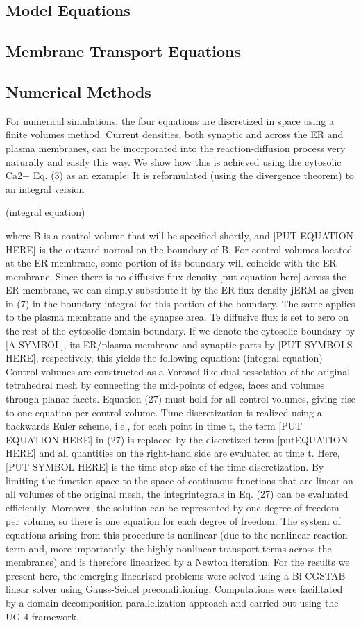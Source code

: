 \documentclass[fleqn,10pt]{wlscirep}
\begin{document}
\subsection*{Model Equations}
\subsection*{Membrane Transport Equations}

\subsection*{Numerical Methods}
For numerical simulations, the four equations are discretized in space using a finite volumes method. Current densities, both synaptic and across the ER and plasma membranes, can be incorporated into the reaction-diffusion process very naturally and easily this way. We show how this is achieved using the cytosolic Ca2+ Eq. (3) as an example: It is reformulated (using the divergence theorem) to an integral version 

(integral equation)

where B is a control volume that will be specified shortly, and [PUT EQUATION HERE] is the outward normal on the boundary of B. For control volumes located at the ER membrane, some portion of its boundary will coincide with the ER membrane. Since there is no diffusive flux density [put equation here] across the ER membrane, we can simply substitute it by the ER flux density jERM as given in (7) in the boundary integral for this portion of the boundary. The same applies to the plasma membrane and the synapse area. Te diffusive flux is set to zero on the rest of the cytosolic domain
boundary. If we denote the cytosolic boundary by [A SYMBOL], its ER/plasma membrane and synaptic parts by [PUT SYMBOLS HERE], respectively, this yields the following equation:
(integral equation)
Control volumes are constructed as a Voronoi-like dual tesselation of the original tetrahedral mesh by connecting the mid-points of edges, faces and volumes through planar facets. Equation (27) must hold for all control volumes, giving rise to one equation per control volume.
Time discretization is realized using a backwards Euler scheme, i.e., for each point in time t, the term [PUT EQUATION HERE] in (27) is replaced by the discretized term [putEQUATION HERE] and all quantities on the right-hand side are evaluated at time t. Here, [PUT SYMBOL HERE] is the time step size of the time discretization. By limiting the function space to the space of continuous functions that are linear on all volumes of the original mesh, the integrintegrals in Eq. (27) can be evaluated efficiently. Moreover, the solution can be represented by one degree of freedom per volume, so there is one equation for each degree of freedom. The system of equations arising from this procedure is nonlinear (due to the nonlinear reaction term and, more importantly, the highly nonlinear transport terms across the membranes) and is therefore linearized by a Newton iteration.
For the results we present here, the emerging linearized problems were solved using a Bi-CGSTAB linear solver using Gauss-Seidel preconditioning. Computations were facilitated by a domain decomposition parallelization approach and carried out using the UG 4 framework.
\end{document}
